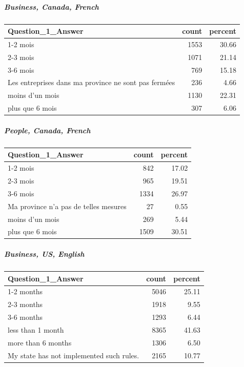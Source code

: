 \documentclass[
]{article}
\begin{document}
\hypertarget{business-canada-french}{%
\subparagraph{Business, Canada, French}\label{business-canada-french}}

\begin{longtable}[]{@{}lrr@{}}
\toprule
Question\_1\_Answer & count & percent \\
\midrule
\endhead
1-2 mois & 1553 & 30.66 \\
2-3 mois & 1071 & 21.14 \\
3-6 mois & 769 & 15.18 \\
Les entreprises dans ma province ne sont pas fermées & 236 & 4.66 \\
moins d'un mois & 1130 & 22.31 \\
plus que 6 mois & 307 & 6.06 \\
\bottomrule
\end{longtable}

\hypertarget{people-canada-french}{%
\subparagraph{People, Canada, French}\label{people-canada-french}}

\begin{longtable}[]{@{}lrr@{}}
\toprule
Question\_1\_Answer & count & percent \\
\midrule
\endhead
1-2 mois & 842 & 17.02 \\
2-3 mois & 965 & 19.51 \\
3-6 mois & 1334 & 26.97 \\
Ma province n'a pas de telles mesures & 27 & 0.55 \\
moins d'un mois & 269 & 5.44 \\
plus que 6 mois & 1509 & 30.51 \\
\bottomrule
\end{longtable}

\hypertarget{business-us-english}{%
\subparagraph{Business, US, English}\label{business-us-english}}

\begin{longtable}[]{@{}lrr@{}}
\toprule
Question\_1\_Answer & count & percent \\
\midrule
\endhead
1-2 months & 5046 & 25.11 \\
2-3 months & 1918 & 9.55 \\
3-6 months & 1293 & 6.44 \\
less than 1 month & 8365 & 41.63 \\
more than 6 months & 1306 & 6.50 \\
My state has not implemented such rules. & 2165 & 10.77 \\
\bottomrule
\end{longtable}
\end{document}
